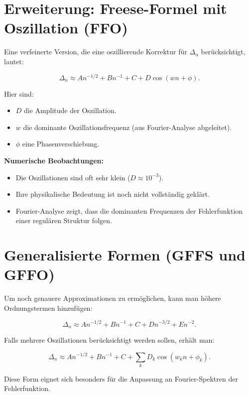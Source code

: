 \documentclass[a4paper,12pt]{article}
\begin{document}
\section{Erweiterung: Freese-Formel mit Oszillation (FFO)}
Eine verfeinerte Version, die eine oszillierende Korrektur für $\Delta_n$ berücksichtigt, lautet:

\begin{equation}
    \Delta_n \approx A n^{-1/2} + B n^{-1} + C + D \cos(w n + \phi).
\end{equation}

Hier sind:
\begin{itemize}
    \item $D$ die Amplitude der Oszillation.
    \item $w$ die dominante Oszillationsfrequenz (aus Fourier-Analyse abgeleitet).
    \item $\phi$ eine Phasenverschiebung.
\end{itemize}

\textbf{Numerische Beobachtungen:}
\begin{itemize}
    \item Die Oszillationen sind oft sehr klein ($D \approx 10^{-3}$).
    \item Ihre physikalische Bedeutung ist noch nicht vollständig geklärt.
    \item Fourier-Analyse zeigt, dass die dominanten Frequenzen der Fehlerfunktion einer regulären Struktur folgen.
\end{itemize}

\section{Generalisierte Formen (GFFS und GFFO)}
Um noch genauere Approximationen zu ermöglichen, kann man höhere Ordnungstermen hinzufügen:

\begin{equation}
    \Delta_n \approx A n^{-1/2} + B n^{-1} + C + D n^{-3/2} + E n^{-2}.
\end{equation}

Falls mehrere Oszillationen berücksichtigt werden sollen, erhält man:

\begin{equation}
    \Delta_n \approx A n^{-1/2} + B n^{-1} + C + \sum_{k} D_k \cos(w_k n + \phi_k).
\end{equation}

Diese Form eignet sich besonders für die Anpassung an Fourier-Spektren der Fehlerfunktion.
\end{document}
